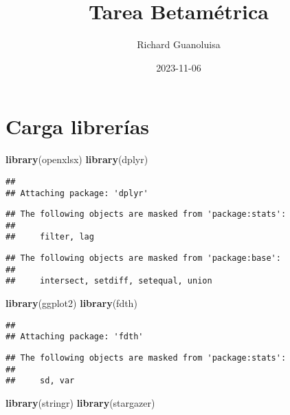 \documentclass[
]{article}
\title{Tarea Betamétrica}
\author{Richard Guanoluisa}
\date{2023-11-06}
\newenvironment{Shaded}{\begin{snugshade}}{\end{snugshade}}
\newcommand{\FunctionTok}[1]{\textcolor[rgb]{0.13,0.29,0.53}{\textbf{#1}}}
\newcommand{\NormalTok}[1]{#1}
\begin{document}
\maketitle

\hypertarget{carga-libreruxedas}{%
\section{Carga librerías}\label{carga-libreruxedas}}

\begin{Shaded}
\begin{Highlighting}[]
\FunctionTok{library}\NormalTok{(openxlsx)}
\FunctionTok{library}\NormalTok{(dplyr)}
\end{Highlighting}
\end{Shaded}

\begin{verbatim}
## 
## Attaching package: 'dplyr'
\end{verbatim}

\begin{verbatim}
## The following objects are masked from 'package:stats':
## 
##     filter, lag
\end{verbatim}

\begin{verbatim}
## The following objects are masked from 'package:base':
## 
##     intersect, setdiff, setequal, union
\end{verbatim}

\begin{Shaded}
\begin{Highlighting}[]
\FunctionTok{library}\NormalTok{(ggplot2)}
\FunctionTok{library}\NormalTok{(fdth)}
\end{Highlighting}
\end{Shaded}

\begin{verbatim}
## 
## Attaching package: 'fdth'
\end{verbatim}

\begin{verbatim}
## The following objects are masked from 'package:stats':
## 
##     sd, var
\end{verbatim}

\begin{Shaded}
\begin{Highlighting}[]
\FunctionTok{library}\NormalTok{(stringr)}
\FunctionTok{library}\NormalTok{(stargazer)}
\end{Highlighting}
\end{Shaded}
\end{document}
